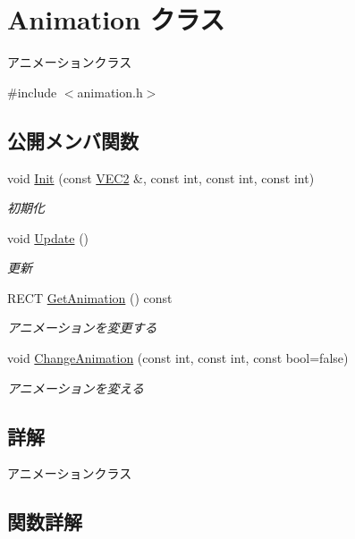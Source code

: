 \hypertarget{class_animation}{}\section{Animation クラス}
\label{class_animation}


アニメーションクラス  




{\ttfamily \#include $<$animation.\+h$>$}

\subsection*{公開メンバ関数}
\begin{DoxyCompactItemize}
\item 
void \mbox{\hyperlink{class_animation_af745af1b6e861b20db426b92a980d4bd}{Init}} (const \mbox{\hyperlink{common_8h_afb0c5e21d4133ff4f200992c0b534e1b}{V\+E\+C2}} \&, const int, const int, const int)
\begin{DoxyCompactList}\small\item\em 初期化 \end{DoxyCompactList}\item 
void \mbox{\hyperlink{class_animation_a0c6a4e940db84d4a6246fcb3ae773402}{Update}} ()
\begin{DoxyCompactList}\small\item\em 更新 \end{DoxyCompactList}\item 
R\+E\+CT \mbox{\hyperlink{class_animation_a6a4980272204d8d2027c206f89984e47}{Get\+Animation}} () const
\begin{DoxyCompactList}\small\item\em アニメーションを変更する \end{DoxyCompactList}\item 
void \mbox{\hyperlink{class_animation_ae9fe84bd92b1df395dd09aeed37a8373}{Change\+Animation}} (const int, const int, const bool=false)
\begin{DoxyCompactList}\small\item\em アニメーションを変える \end{DoxyCompactList}\end{DoxyCompactItemize}


\subsection{詳解}
アニメーションクラス 

\subsection{関数詳解}
\mbox{\label{class_animation_ae9fe84bd92b1df395dd09aeed37a8373}} 
